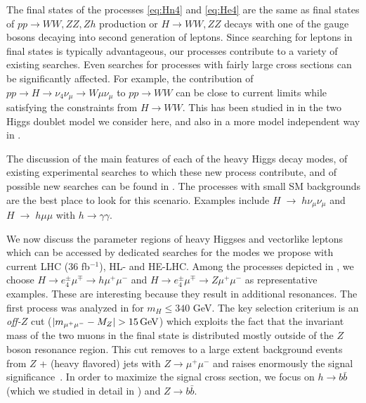 The final states of the processes \eqref{eq:Hn4} and \eqref{eq:He4} are the same as final states of $pp \to WW, ZZ, Zh$ production or $H \to WW, ZZ$ decays with one of the gauge bosons decaying into second generation of leptons.  Since searching for leptons in final states is typically advantageous,  our processes contribute to a variety of existing searches.  Even searches for processes with fairly large cross sections can be significantly affected. For example, the contribution of  $pp \to H \to \nu_4 \nu_\mu \to W \mu \nu_\mu$  to $pp \to WW$ can be close to current limits while satisfying the constraints from  $H \to WW$. This has been studied in  in the two Higgs doublet model we consider here, and also in a more model independent way in . 

The discussion of the main features of each of the heavy Higgs decay modes, of existing experimental searches to which these new process contribute, and of possible new searches can be found in . 
The processes with small SM backgrounds are the best place to look for this scenario. Examples include $H \; \to \; h \nu_\mu \nu_\mu$ and $H \; \to \; h \mu\mu$ with $h\to \gamma \gamma$. 



We now discuss the parameter regions of heavy Higgses and vectorlike leptons which can be accessed by dedicated searches for the modes we propose with current LHC (36 fb$^{-1}$), HL- and HE-LHC. Among the processes depicted in , we choose $H \to e_4^\pm \mu^\mp \to h \mu^+ \mu^-$  and $H \to e_4^\pm \mu^\mp \to Z \mu^+ \mu^-$ as representative examples. These are interesting because they result in additional resonances. The first process was analyzed in  for $m_H \le 340$ GeV. The key selection criterium is an {\it off-$Z$} cut ($|m_{\mu^+ \mu^-} - M_Z| > 15\,{\rm GeV}$) which exploits the fact that the invariant mass of the two muons in the final state is distributed mostly outside of the $Z$ boson resonance region. This cut removes to a large extent background events from $Z$ + (heavy flavored) jets with $Z \to \mu^+ \mu^-$ and raises enormously the signal significance~\cite{Dermisek:2016via}. In order to maximize the signal cross section, we focus on $h \to b \bar{b}$ (which we studied in detail in ) and $Z \to b \bar{b}$.

